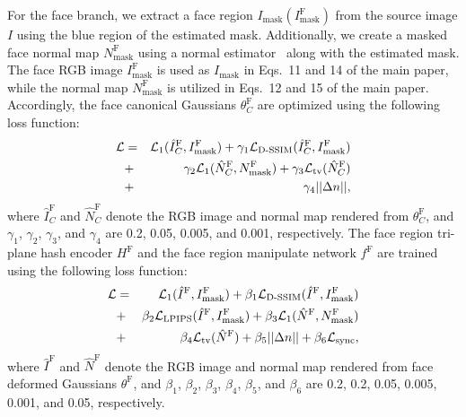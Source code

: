 For the face branch, we extract a face region $I_\text{mask} (I^\text{F}_\text{mask})$ from the source image $I$ using the blue region of the estimated mask. Additionally, we create a masked face normal map $N^\text{F}_\text{mask}$ using a normal estimator~\cite{Abrevaya_2020_CVPR} along with the estimated mask. The face RGB image $I^\text{F}_\text{mask}$ is used as $I_\text{mask}$ in Eqs.~11 and 14 of the main paper, while the normal map $N^\text{F}_\text{mask}$ is utilized in Eqs.~12 and 15 of the main paper. Accordingly, the face canonical Gaussians $\theta^\text{F}_C$ are optimized using the following loss function:
\begin{eqnarray}
    \mathcal{L} &=& \mathcal{L}_1 (\hat{I}^\text{F}_C, I^\text{F}_\text{mask}) + \gamma_1 \mathcal{L}_\text{D-SSIM} (\hat{I}^\text{F}_C, I^\text{F}_\text{mask}) \nonumber\\
    &+& \gamma_2 \mathcal{L}_1 (\hat{N}^\text{F}_C, N^\text{F}_\text{mask}) + \gamma_3 \mathcal{L}_\text{tv} (\hat{N}^\text{F}_C) \nonumber \\
    &+& \gamma_4 || \Delta n ||,
\end{eqnarray}
where $\hat{I}^\text{F}_C$ and $\hat{N}^\text{F}_C$ denote the RGB image and normal map rendered from $\theta^\text{F}_C$, and $\gamma_1$, $\gamma_2$, $\gamma_3$, and $\gamma_4$ are 0.2, 0.05, 0.005, and 0.001, respectively. The face region tri-plane hash encoder $H^\text{F}$ and the face region manipulate network $f^\text{F}$ are trained using the following loss function:
\begin{eqnarray}
    \mathcal{L} &=& \mathcal{L}_1 (\hat{I}^\text{F}, I^\text{F}_\text{mask}) + \beta_1 \mathcal{L}_\text{D-SSIM} (\hat{I}^\text{F}, I^\text{F}_\text{mask}) \nonumber \\
    &+& \beta_2 \mathcal{L}_\text{LPIPS} (\hat{I}^\text{F}, I^\text{F}_\text{mask}) + \beta_3 \mathcal{L}_1 (\hat{N}^\text{F}, N^\text{F}_\text{mask}) \nonumber \\
    &+& \beta_4 \mathcal{L}_\text{tv} (\hat{N}^\text{F}) + \beta_5 || \Delta n || + \beta_6 \mathcal{L}_\text{sync},
\end{eqnarray}
where $\hat{I}^\text{F}$ and $\hat{N}^\text{F}$ denote the RGB image and normal map rendered from face deformed Gaussians $\theta^\text{F}$, and $\beta_1$, $\beta_2$, $\beta_3$, $\beta_4$, $\beta_5$, and $\beta_6$ are 0.2, 0.2, 0.05, 0.005, 0.001, and 0.05, respectively.

